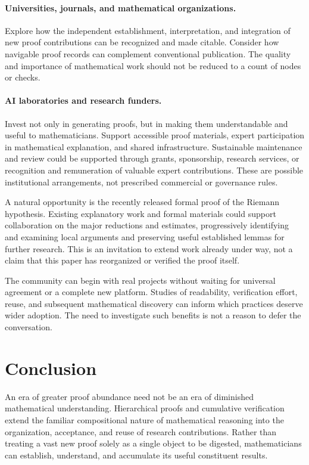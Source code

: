 \documentclass[11pt,a4paper]{article}
\theoremstyle{definition}\newtheorem{definition}{Definition}
\begin{document}
\paragraph{Universities, journals, and mathematical organizations.} Explore how the independent establishment, interpretation, and integration of new proof contributions can be recognized and made citable. Consider how navigable proof records can complement conventional publication. The quality and importance of mathematical work should not be reduced to a count of nodes or checks.

\paragraph{AI laboratories and research funders.} Invest not only in generating proofs, but in making them understandable and useful to mathematicians. Support accessible proof materials, expert participation in mathematical explanation, and shared infrastructure. Sustainable maintenance and review could be supported through grants, sponsorship, research services, or recognition and remuneration of valuable expert contributions. These are possible institutional arrangements, not prescribed commercial or governance rules.

A natural opportunity is the recently released formal proof of the Riemann hypothesis. Existing explanatory work and formal materials could support collaboration on the major reductions and estimates, progressively identifying and examining local arguments and preserving useful established lemmas for further research. This is an invitation to extend work already under way, not a claim that this paper has reorganized or verified the proof itself.

The community can begin with real projects without waiting for universal agreement or a complete new platform. Studies of readability, verification effort, reuse, and subsequent mathematical discovery can inform which practices deserve wider adoption. The need to investigate such benefits is not a reason to defer the conversation.

\section{Conclusion}
An era of greater proof abundance need not be an era of diminished mathematical understanding. Hierarchical proofs and cumulative verification extend the familiar compositional nature of mathematical reasoning into the organization, acceptance, and reuse of research contributions. Rather than treating a vast new proof solely as a single object to be digested, mathematicians can establish, understand, and accumulate its useful constituent results.
\end{document}
